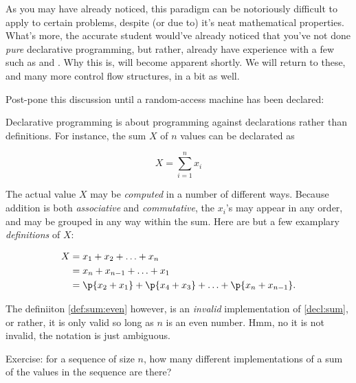 As you may have already noticed, this paradigm can be notoriously difficult to
apply to certain problems, despite (or due to) it's neat mathematical
properties.  What's more, the accurate student would've already noticed that
you've not done \emph{pure} declarative programming, but rather, already have
experience with a few  such as  and
 .  Why this is, will become
apparent shortly. We will return to these, and many more control flow
structures, in a bit as well.

Post-pone this discussion until a random-access machine has been declared:

Declarative programming is about programming against declarations rather than
definitions. For instance, the sum $X$ of $n$ values can be declarated as

\begin{equation}
X=\sum_{i=1}^n x_i\label{decl:sum}
\end{equation}

The actual value $X$ may be \emph{computed} in a number of different ways.
Because addition is both \emph{associative} and \emph{commutative}, the $x_i$'s
may appear in any order, and may be grouped in any way within the sum. Here are
but a few examplary \emph{definitions} of $X$:

\begin{align}
X&=x_1+x_2+\ldots+x_n\\
&=x_n+x_{n-1}+\ldots+x_1\\
&=\p{x_2+x_1}+\p{x_4+x_3}+\ldots+\p{x_n+x_{n-1}}\label{def:sum:even}.
\end{align}

The definiiton \ref{def:sum:even} however, is an \emph{invalid} implementation
of \ref{decl:sum}, or rather, it is only valid so long as $n$ is an even
number. Hmm, no it is not invalid, the notation is just ambiguous.


Exercise: for a sequence of size $n$, how many different implementations of a
sum of the values in the sequence are there?
